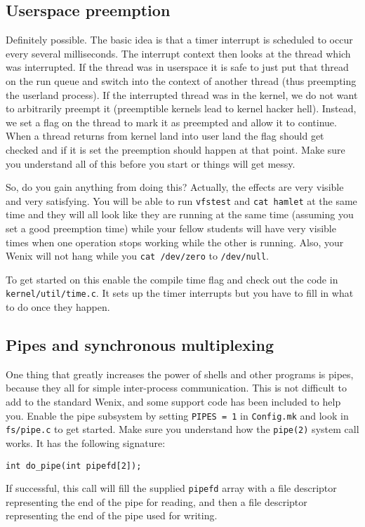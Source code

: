 \subsection{Userspace preemption}
Definitely possible. The basic idea is that a timer interrupt is scheduled to occur every several milliseconds. The interrupt context then looks at the thread which was interrupted. If the thread was in userspace it is safe to just put that thread on the run queue and switch into the context of another thread (thus preempting the userland process). If the interrupted thread was in the kernel, we do not want to arbitrarily preempt it (preemptible kernels lead to kernel hacker hell). Instead, we set a flag on the thread to mark it as preempted and allow it to continue. When a thread returns from kernel land into user land the flag should get checked and if it is set the preemption should happen at that point. Make sure you understand all of this before you start or things will get messy.

So, do you gain anything from doing this? Actually, the effects are very visible and very satisfying. You will be able to run \texttt{vfstest} and \texttt{cat hamlet} at the same time and they will all look like they are running at the same time (assuming you set a good preemption time) while your fellow students will have very visible times when one operation stops working while the other is running. Also, your Wenix will not hang while you \texttt{cat /dev/zero} to \texttt{/dev/null}.

To get started on this enable the compile time flag and check out the code in \texttt{kernel/util/time.c}.  It sets up the timer interrupts but you have to fill in what to do once they happen.

\subsection{Pipes and synchronous multiplexing}
One thing that greatly increases the power of shells and other programs is pipes, because they all for simple inter-process communication. This is not difficult to add to the standard Wenix, and some support code has been included to help you. Enable the pipe subsystem by setting \texttt{PIPES = 1} in \texttt{Config.mk} and look in \texttt{fs/pipe.c} to get started. Make sure you understand how the \texttt{pipe(2)} system call works. It has the following signature:

\begin{verbatim}
int do_pipe(int pipefd[2]);\end{verbatim}
If successful, this call will fill the supplied \texttt{pipefd} array with a file descriptor representing the end of the pipe for reading, and then a file descriptor representing the end of the pipe used for writing.

